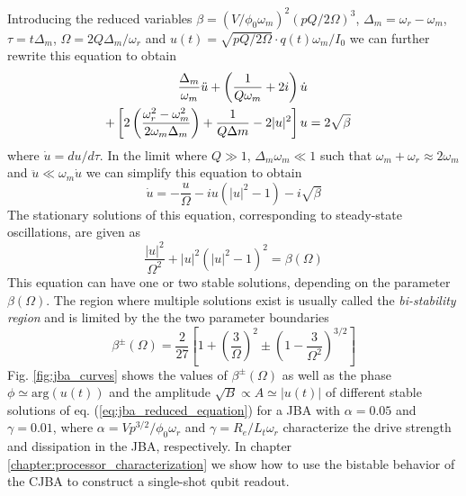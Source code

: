 Introducing the reduced variables $\beta = (V/\phi_0 \omega_m)^2(pQ/2\Omega)^3$, $\Delta_m = \omega_r-\omega_m$, $\tau = t\Delta_m$, $\Omega=2Q\Delta_m/\omega_r$ and $u(t) = \sqrt{pQ/2\Omega}\cdot q(t)\omega_m/I_0$ we can further rewrite this equation to obtain
%
\begin{align}
\frac{\Delta_m}{\omega_m}\ddot{u}+\left(\frac{1}{Q \omega_m}+2i\right)\dot{u} \notag \\
 + \left[ 2\left(\frac{\omega_r^2-\omega_m^2}{2\omega_m \Delta_m}\right)+\frac{1}{Q\Delta m}-2|u|^2\right]u & =  2\sqrt{\beta} \label{eq:jba_theory_1}
\end{align}
%
where $\dot{u}=du/d\tau$. In the limit where $Q \gg 1$, $\Delta_m\omega_m \ll 1$ such that $\omega_m+\omega_r \approx 2\omega_m$ and $\ddot{u}\ll\omega_m \dot{u}$ we can simplify this equation to obtain
%
\begin{equation}
\dot{u} = -\frac{u}{\Omega}-iu\left(|u|^2-1\right)-i\sqrt{\beta} \label{eq:jba_reduced_equation}
\end{equation}
%
The stationary solutions of this equation, corresponding to steady-state oscillations, are given as
%
\begin{equation}
\frac{|u|^2}{\Omega^2}+|u|^2\left(|u|^2-1\right)^2 = \beta(\Omega)
\end{equation}
%
This equation can have one or two stable solutions, depending on the parameter $\beta(\Omega)$. The region where multiple solutions exist is usually called the {\it bi-stability region} and is limited by the the two parameter boundaries
%
\begin{equation}
\beta^\pm(\Omega) = \frac{2}{27}\left[1+\left(\frac{3}{\Omega}\right)^2\pm\left(1-\frac{3}{\Omega^2}\right)^{3/2}\right] \label{eq:jba_beta}
\end{equation}
%
Fig. \ref{fig:jba_curves} shows the values of $\beta^\pm(\Omega)$ as well as the phase $\phi\simeq \mathrm{arg}(u(t))$ and the amplitude $\sqrt{B}\propto A \simeq |u(t)|$ of different stable solutions of eq. (\ref{eq:jba_reduced_equation}) for a JBA with $\alpha=0.05$ and $\gamma=0.01$, where $\alpha=Vp^{3/2}/\phi_0 \omega_r$ and $\gamma = R_e/L_t\omega_r$ characterize the drive strength and dissipation in the JBA, respectively. In chapter \ref{chapter:processor_characterization} we show how to use the bistable behavior of the CJBA to construct a single-shot qubit readout.

